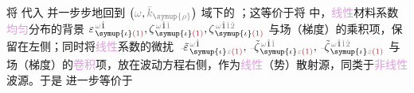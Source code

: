 
将  代入  并一步步地回到 $\left( \mathcolor{gray}{\omega}, \mathcolor{gray}{\bar{k}_{\symup{\rho}}} \right)$ 域下的 ；这等价于将  中，\textcolor{Plum}{线性}材料系数\textcolor{Plum}{均匀}分布的背景 $\varepsilon^{\;\! \mathcolor{gray}{\omega} \hat{1}}_{\;\! \symup{\iota} \textcolor{Maroon}{(1)}}, \zeta^{\;\! \mathcolor{gray}{\omega} \hat{1} \mathcolor{gray}{\check{1}}}_{\;\! \symup{\iota} \textcolor{Maroon}{(1)}}, \zeta^{\;\! \mathcolor{gray}{\omega} \hat{1} \mathcolor{gray}{\check{1} \check{2}}}_{\;\! \symup{\iota} \textcolor{Maroon}{(1)}}$ 与场（梯度）的乘积项，保留在左侧；同时将\textcolor{Plum}{线性}系数的\textcolor{NavyBlue}{微扰} $\Xint{\begin{smallmatrix} ~ \\ {}^{}_{\mathcolor{gray}{-}} \\ ~ \end{smallmatrix}}{16}{\tilde{\varepsilon}}^{\;\! \mathcolor{gray}{\omega} \hat{1}}_{\;\! \symup{\iota} \mathcolor{gray}{z} \textcolor{Maroon}{(1)}}, \Xint{\begin{smallmatrix} ~ \\ {}^{}_{\mathcolor{gray}{-}} \\ ~ \end{smallmatrix}}{12}{\tilde{\zeta}}^{\;\! \mathcolor{gray}{\omega} \hat{1} \mathcolor{gray}{\check{1}}}_{\;\! \symup{\iota} \mathcolor{gray}{z} \textcolor{Maroon}{(1)}}, \Xint{\begin{smallmatrix} ~ \\ {}^{}_{\mathcolor{gray}{-}} \\ ~ \end{smallmatrix}}{12}{\tilde{\zeta}}^{\;\! \mathcolor{gray}{\omega} \hat{1} \mathcolor{gray}{\check{1} \check{2}}}_{\;\! \symup{\iota} \mathcolor{gray}{z} \textcolor{Maroon}{(1)}}$ 与场（梯度）的\textcolor{Plum}{卷积}项，放在波动方程右侧，作为\textcolor{Plum}{线性}（势）散射源\cite{bornPrinciplesOptics60th2019,gerkeAperiodicVolumeOptics2010}，同类于\textcolor{Plum}{非线性}\textcolor{NavyBlue}{波源}。于是  进一步等价于
